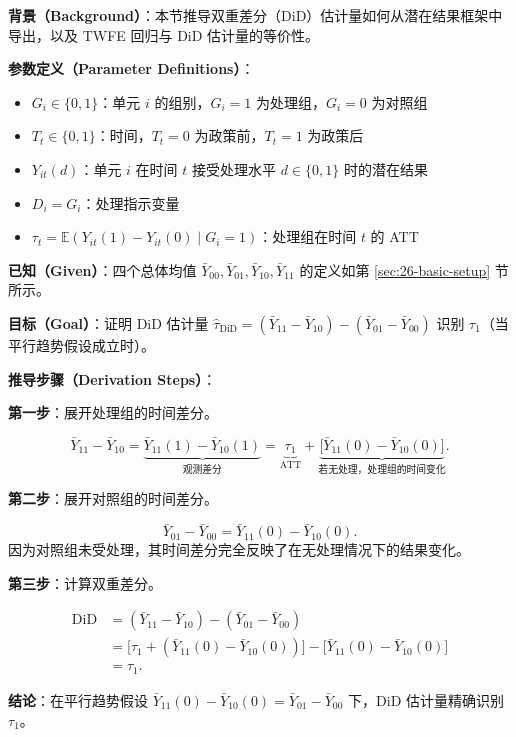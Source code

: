 \textbf{背景（Background）}：本节推导双重差分（DiD）估计量如何从潜在结果框架中导出，以及 TWFE 回归与 DiD 估计量的等价性。

\textbf{参数定义（Parameter Definitions）}：
\begin{itemize}
  \item $G_i \in \{0, 1\}$：单元 $i$ 的组别，$G_i=1$ 为处理组，$G_i=0$ 为对照组
  \item $T_t \in \{0, 1\}$：时间，$T_t=0$ 为政策前，$T_t=1$ 为政策后
  \item $Y_{it}(d)$：单元 $i$ 在时间 $t$ 接受处理水平 $d \in \{0,1\}$ 时的潜在结果
  \item $D_i = G_i$：处理指示变量
  \item $\tau_t = \mathbb{E}(Y_{it}(1) - Y_{it}(0) \mid G_i=1)$：处理组在时间 $t$ 的 ATT
\end{itemize}

\textbf{已知（Given）}：四个总体均值 $\bar{Y}_{00}, \bar{Y}_{01}, \bar{Y}_{10}, \bar{Y}_{11}$ 的定义如第 \ref{sec:26-basic-setup} 节所示。

\textbf{目标（Goal）}：证明 DiD 估计量 $\hat{\tau}_\text{DiD} = (\bar{Y}_{11} - \bar{Y}_{10}) - (\bar{Y}_{01} - \bar{Y}_{00})$ 识别 $\tau_1$（当平行趋势假设成立时）。

\textbf{推导步骤（Derivation Steps）}：

\textbf{第一步}：展开处理组的时间差分。

\[
\bar{Y}_{11} - \bar{Y}_{10} = \underbrace{\bar{Y}_{11}(1) - \bar{Y}_{10}(1)}_{\text{观测差分}} = \underbrace{\tau_1}_{\text{ATT}} + \underbrace{\bigl[ \bar{Y}_{11}(0) - \bar{Y}_{10}(0) \bigr]}_{\text{若无处理，处理组的时间变化}}.
\]

\textbf{第二步}：展开对照组的时间差分。

\[
\bar{Y}_{01} - \bar{Y}_{00} = \bar{Y}_{11}(0) - \bar{Y}_{10}(0).
\]
因为对照组未受处理，其时间差分完全反映了在无处理情况下的结果变化。

\textbf{第三步}：计算双重差分。

\[
\begin{aligned}
\text{DiD} &= (\bar{Y}_{11} - \bar{Y}_{10}) - (\bar{Y}_{01} - \bar{Y}_{00}) \\
&= \bigl[ \tau_1 + (\bar{Y}_{11}(0) - \bar{Y}_{10}(0)) \bigr] - \bigl[ \bar{Y}_{11}(0) - \bar{Y}_{10}(0) \bigr] \\
&= \tau_1.
\end{aligned}
\]

\textbf{结论}：在平行趋势假设 $\bar{Y}_{11}(0) - \bar{Y}_{10}(0) = \bar{Y}_{01} - \bar{Y}_{00}$ 下，DiD 估计量精确识别 $\tau_1$。

